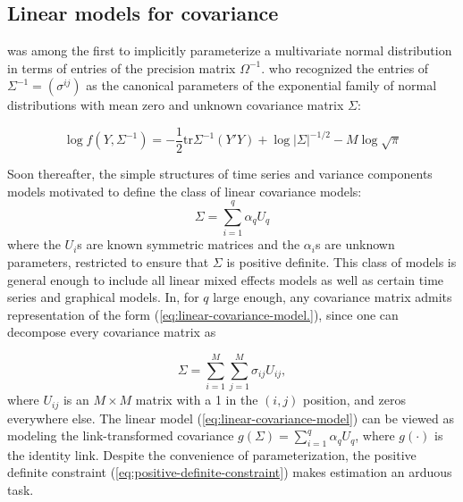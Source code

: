 \bigskip

\subsection{Linear models for covariance}
\cite{gabriel1962ante} was among the first to implicitly parameterize a multivariate normal distribution in terms of entries of the precision matrix $\Omega^{-1}$.  \cite{dempster1972covariance} who recognized the entries of $\Sigma^{-1} = \left(\sigma^{ij} \right)$ as the canonical parameters of the exponential family of normal distributions with mean zero and unknown covariance matrix $\Sigma$:

\[
\log f\left(Y, \Sigma^{-1}\right) = -\frac{1}{2}\mbox{tr}\Sigma^{-1} \left(Y'Y\right) + \log\vert \Sigma \vert^{-1/2} - M \log\sqrt{\pi}
\]

Soon thereafter, the simple structures of time series and variance components models motivated \cite{anderson1973asymptotically} to define the class of linear covariance models:
\begin{equation}\label{eq:linear-covariance-model}
\Sigma = \sum_{i = 1}^q \alpha_qU_q
\end{equation}
\noindent
where the $U_i$s are known symmetric matrices and the $\alpha_i$s are unknown parameters, restricted to ensure that $\Sigma$ is positive definite. This class of models is general enough to include all linear mixed effects models as well as certain time series and graphical models. In, for $q$ large enough, any covariance matrix admits representation of the form (\ref{eq:linear-covariance-model.}), since one can decompose every covariance matrix as 

\begin{equation} \label{eq:linear-covariance-model-2}	
\Sigma = \sum_{i = 1}^M \sum_{j = 1}^M \sigma_{ij} U_{ij},
\end{equation}
\noindent
where $U_{ij}$ is an $M \times M$ matrix with a 1 in the $\left(i,j\right)$ position, and zeros everywhere else. The linear model (\ref{eq:linear-covariance-model}) can be viewed as modeling the link-transformed covariance $g\left(\Sigma\right) =\sum_{i = 1}^q \alpha_qU_q$, where $g\left(\cdot\right)$ is the identity link. Despite the convenience of parameterization, the positive definite constraint (\ref{eq:positive-definite-constraint}) makes estimation an arduous task. 

